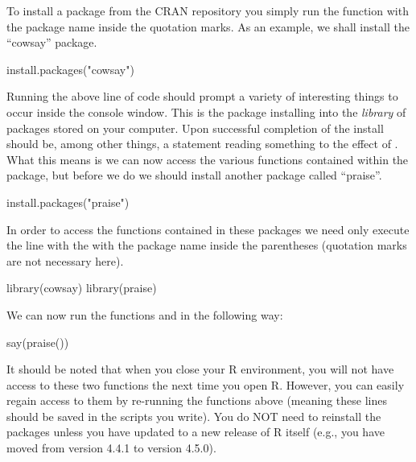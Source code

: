 To install a package from the CRAN repository you simply run the function  with the package name inside the quotation marks. As an example, we shall install the ``cowsay'' package.

\begin{inR}
install.packages("cowsay")
\end{inR}
\medskip

Running the above line of code should prompt a variety of interesting things to occur inside the console window. This is the package installing into the \textit{library} of packages stored on your computer. Upon successful completion of the install should be, among other things, a statement reading something to the effect of .  What this means is we can now access the various functions contained within the package, but before we do we should install another package called ``praise''.

\begin{inR}
install.packages("praise")
\end{inR}
\medskip

In order to access the functions contained in these packages we need only execute the line  with the with the package name inside the parentheses (quotation marks are not necessary here).

\begin{inR}
library(cowsay)
library(praise)
\end{inR}
\medskip

\noindent
We can now run the functions  and  in the following way: 

\begin{inR}
say(praise())
\end{inR}
\medskip

It should be noted that when you close your R environment, you will not have access to these two functions the next time you open R.  However, you can easily regain access to them by re-running the  functions above (meaning these lines should be saved in the scripts you write).  You do NOT need to reinstall the packages unless you have updated to a new release of R itself (e.g., you have moved from version 4.4.1 to version 4.5.0).


